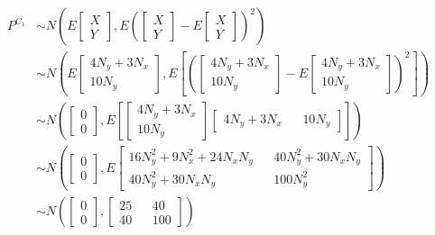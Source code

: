 \documentclass{article}
\begin{document}
    \begin{align*}
        P^{C_1} &\sim N\left(E\begin{bmatrix}
            X \\
            Y
        \end{bmatrix}, E \left ( \begin{bmatrix}
            X\\ Y
        \end{bmatrix}-E\begin{bmatrix}
            X \\
            Y
        \end{bmatrix}\right)^2\right)\\
        &\sim N \left ( E\begin{bmatrix}
            4N_y + 3N_x\\
            10N_y
        \end{bmatrix}, E\left[ \left ( \begin{bmatrix}
           4N_y + 3N_x\\
            10N_y 
        \end{bmatrix}-E \begin{bmatrix}
           4N_y + 3N_x\\
            10N_y
        \end{bmatrix}\right )^2\right]\right)\\
        &\sim N \left ( \begin{bmatrix}
            0\\0
        \end{bmatrix},E\left[ \begin{bmatrix}
           4N_y + 3N_x\\
            10N_y 
        \end{bmatrix}\begin{bmatrix}
           4N_y + 3N_x &&
            10N_y 
        \end{bmatrix}\right]\right )\\
        & \sim N \left ( \begin{bmatrix}
            0\\0
        \end{bmatrix},E  \begin{bmatrix}
            16N_y^2+9N_x^2+24N_xN_y  && 40N_y^2 + 30 N_x N_y \\
            40N_y^2 + 30 N_x N_y && 100N_y^2
        \end{bmatrix}\right )\\
        & \sim N \left (\begin{bmatrix}
            0 \\
            0
        \end{bmatrix}, \begin{bmatrix}
            25 && 40\\
            40 && 100
        \end{bmatrix} \right )
    \end{align*}
\end{document}
